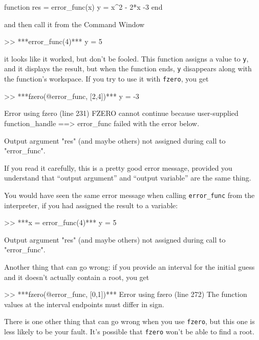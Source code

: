 \begin{code}
function res = error_func(x)
    y = x^2 - 2*x -3
end
\end{code}
and then call it from the Command Window
\begin{code}
>> ***error_func(4)***
y = 5
\end{code}
it looks like it worked, but don't be fooled.  This function assigns
a value to \lstinline{y}, and it displays the result, but when the function
ends, \lstinline{y} disappears along with the function's workspace.
If you try to use it with \lstinline{fzero}, you get

\begin{code}
>> ***fzero(@error_func, [2,4])***
y = -3

Error using fzero (line 231)
FZERO cannot continue because user-supplied function_handle ==>
error_func failed with the error below.

Output argument "res" (and maybe others) not assigned during call
to "error_func".
\end{code}

If you read it carefully, this is a pretty good error message,
provided you understand that ``output argument'' and ``output variable'' are the same thing.


You would have seen the same error message when calling \lstinline{error_func} from the interpreter, if you had assigned the result to a variable:

\begin{code}
>> ***x = error_func(4)***
y = 5

Output argument "res" (and maybe others) not assigned during
call to "error_func".
\end{code}

Another thing that can go wrong: if you provide an interval for the
initial guess and it doesn't actually contain a root, you get

\begin{code}
>> ***fzero(@error_func, [0,1])***
Error using fzero (line 272)
The function values at the interval endpoints must differ in sign.
\end{code}


There is one other thing that can go wrong when you use \lstinline{fzero}, but
this one is less likely to be your fault.  It's possible that \lstinline{fzero}
won't be able to find a root.

